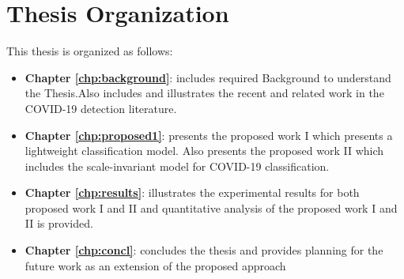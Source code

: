 \section{Thesis Organization}
This thesis is organized as follows: 
\begin{itemize}
    \item \textbf{Chapter \ref{chp:background}}: includes required Background to understand the Thesis.Also includes and illustrates the recent and related work in the COVID-19 detection literature. 
    \item \textbf{Chapter \ref{chp:proposed1}}: presents the proposed work I which presents a lightweight classification model. Also presents the proposed work II which includes the scale-invariant model for COVID-19 classification. 
    \item \textbf{Chapter \ref{chp:results}}: illustrates the experimental results for both proposed work I and II and quantitative analysis of the proposed work I and II is provided.
    \item \textbf{Chapter \ref{chp:concl}}: concludes the thesis and provides planning for the future work as an extension of the proposed approach
\end{itemize}